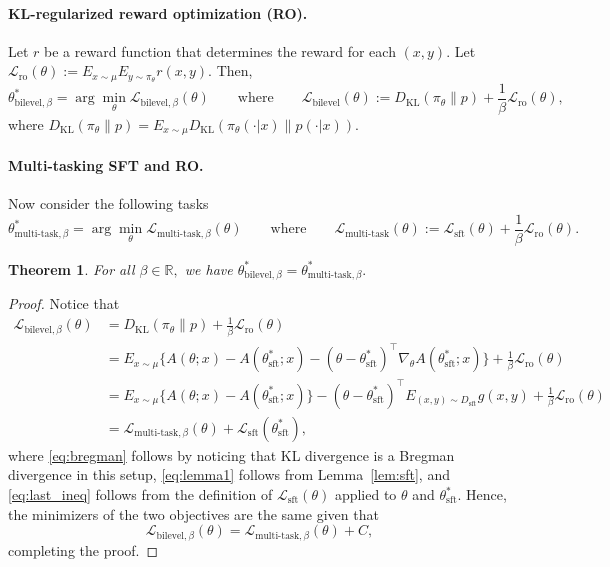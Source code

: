 \documentclass{article}
\newcommand{\p}{\pi_{\text{sft}}}
\newcommand{\sft}{\text{sft}}
\newcommand{\ro}{\text{ro}}
\newcommand{\bilevel}{\text{bilevel}}
\newcommand{\multitask}{\text{multi-task}}
\newcommand{\KL}{D_{\text{KL}}}
\renewcommand{\p}{{p}}
\newtheorem{theorem}{Theorem}
\begin{document}
\paragraph{KL-regularized reward optimization (RO).} Let $r$ be a reward function that determines the reward for each $(x,y).$ Let $\mathcal{L}_\ro(\theta) :=  E_{x \sim \mu} E_{y \sim \pi_\theta} r(x, y)$. Then, 
\begin{equation}
    \theta^*_{\bilevel, \beta} = \arg\min_\theta  \mathcal{L}_{\bilevel, \beta}(\theta) \quad\quad \text{where} \quad\quad \mathcal{L}_\bilevel(\theta ) :=  \KL(\pi_\theta \| \p) + \frac{1}{\beta}\mathcal{L}_\ro(\theta),
\end{equation}
where $\KL(\pi_\theta \| \p) = E_{x \sim \mu} \KL(\pi_\theta(\cdot|x) \| \p(\cdot|x))$.

\paragraph{Multi-tasking SFT and RO.} Now consider the following tasks
\begin{equation}
    \theta^*_{\multitask, \beta} = \arg\min_\theta \mathcal{L}_{\multitask, \beta}(\theta) \quad \quad \text{where} \quad \quad \mathcal{L}_\multitask(\theta) := \mathcal{L}_\sft(\theta) + \frac{1}{\beta} \mathcal{L}_\ro(\theta) .
\end{equation}

\begin{theorem}
For all $\beta \in \mathbb{R},$   we have $\theta^*_{\bilevel, \beta} = \theta^*_{\multitask, \beta}.$
\label{prop:role-of-KL}
\end{theorem}
\begin{proof}
    Notice that
\begin{align}
    \mathcal{L}_{\bilevel,\beta}(\theta) &= \KL(\pi_\theta \| \p) + \frac{1}{\beta} \mathcal{L}_\ro(\theta) \\
    &= E_{x \sim \mu}  \{A(\theta; x) - A(\theta^*_\sft; x) - (\theta- \theta^*_\sft)^\top \nabla_\theta A(\theta^*_\sft; x) \}  +\frac{1}{\beta}\mathcal{L}_\ro(\theta) \label{eq:bregman}\\
    & = E_{x \sim \mu} \{A(\theta; x) - A(\theta^*_\sft; x)\} - (\theta - \theta^*_\sft)^\top E_{(x,y) \sim D_\sft} g(x,y) + \frac{1}{\beta} \mathcal{L}_\ro(\theta) \label{eq:lemma1}\\
    &= \mathcal{L}_{\multitask, \beta}(\theta) + \mathcal{L}_\sft(\theta^*_\sft), \label{eq:last_ineq}
\end{align}
where \cref{eq:bregman} follows by noticing that KL divergence is a Bregman divergence in this setup, \cref{eq:lemma1} follows from Lemma~\ref{lem:sft}, and \cref{eq:last_ineq} follows from the definition of $\mathcal{L}_\sft(\theta)$ applied to $\theta$ and $\theta^*_\sft$. Hence, the minimizers of the two objectives are the same given that $$\mathcal{L}_{\bilevel,\beta}(\theta) = \mathcal{L}_{\multitask, \beta}(\theta)+ C,$$
completing the proof.
\end{proof}
\end{document}
